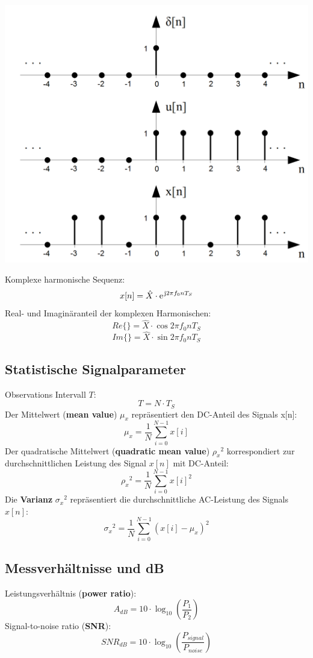 \begin{center}
\includegraphics[scale=.7]{./images/basic_signals}
\end{center}

Komplexe harmonische Sequenz:
\[ x[n] = \hat{X} \cdot \e^{\im 2 \pi f_0 n T_S} \]
Real- und Imaginäranteil der komplexen Harmonischen:
\[ Re\{\} = \hat{X} \cdot \cos 2 \pi f_0 n T_S \]
\[ Im\{\} = \hat{X} \cdot \sin 2 \pi f_0 n T_S \]

\subsection{Statistische Signalparameter}
Observations Intervall $T$:
\[ T = N \cdot T_S \]
Der Mittelwert (\textbf{mean value}) $\mu_x$ repräsentiert
den DC-Anteil des Signals x[n]:
\[ \mu_x = \frac{1}{N} \sum_{i=0}^{N-1}x[i] \]
Der quadratische Mittelwert (\textbf{quadratic mean value}) ${\rho_x}^2$
korrespondiert zur durchschnittlichen Leistung des Signal $x[n]$
mit DC-Anteil:
\[ {\rho_x}^2 = \frac{1}{N} \sum_{i=0}^{N-1} x[i]^2 \]
Die \textbf{Varianz} ${\sigma_x}^2$ repräsentiert die durchschnittliche
AC-Leistung des Signals $x[n]$:
\[ {\sigma_x}^2 = \frac{1}{N} \sum_{i=0}^{N-1}(x[i] - \mu_x)^2 \]

\subsection{Messverhältnisse und dB}
Leistungsverhältnis (\textbf{power ratio}):
\[ A_{dB} = 10 \cdot \log_{10} \left( \frac{P_1}{P_2} \right) \]
Signal-to-noise ratio (\textbf{SNR}):
\[ SNR_{dB} = 10 \cdot \log_{10} \left( \frac{P_{signal}}{P_{noise}} \right) \]

